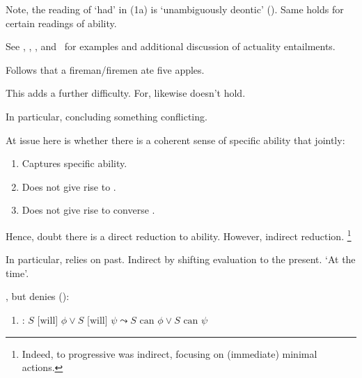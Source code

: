 \begin{note}
{    Note, the reading of `had' in (1a) is `unambiguously deontic' (\citeyear[703]{Alxatib:2019wf}).
    Same holds for certain readings of ability.

    See \textcite{Bhatt:2008wt}, \textcite{Hacquard:2006to,Hacquard:2009ta}, \textcite{Pinon:2003te}, and~\textcite{Werner:2011tp} for examples and additional discussion of actuality entailments.
  }
  Follows that a fireman/firemen ate five apples.

  This adds a further difficulty.
  For, likewise doesn't hold.

  In particular, concluding something conflicting.

  At issue here is whether there is a coherent sense of specific ability that jointly:
  \begin{enumerate}[label=\roman*., ref=(\roman*)]
  \item
    Captures specific ability.
  \item
    Does not give rise to \BoyPS{}.
  \item
    Does not give rise to converse \BoyPS{}.
  \end{enumerate}
\end{note}

\begin{note}[Segue]
  Hence, doubt there is a direct reduction to ability.
  However, indirect reduction.%
  \footnote{
    Indeed,  to progressive was indirect, focusing on (immediate) minimal actions.
    }

  In particular, \BoyPS{} relies on past.
  Indirect by shifting evaluation to the present.
  `At the time'.
\end{note}

\begin{note}
  \BoyPS{}, but denies \BoyVS{} (\citeyear[\S1.2]{Boylan:2020aa}):

  \begin{enumerate}[label=]
  \item
    \label{Boylan:Or-Success}
    \BoyVS{}: \(S\text{ [will] }\phi \lor S\text{ [will] }\psi \leadsto S\text{ can }\phi \lor S\text{ can }\psi\)
  \end{enumerate}
\end{note}

